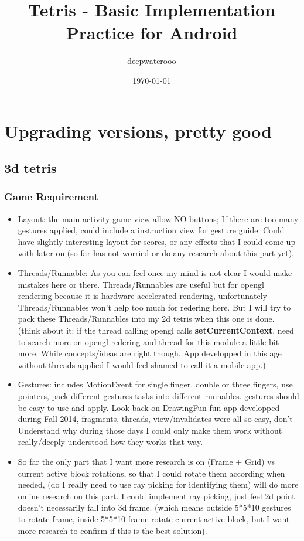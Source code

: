 \documentclass[9pt,b5paper]{article}
\author{deepwaterooo}
\date{\today}
\title{Tetris - Basic Implementation Practice for Android}
\begin{document}
\maketitle
\tableofcontents


\section{Upgrading versions, pretty good}
\label{sec-1}
\subsection{3d tetris}
\label{sec-1-1}
\subsubsection{Game Requirement}
\label{sec-1-1-1}
\begin{itemize}
\item Layout: the main activity game view allow NO buttons; If there are too many gestures applied, could include a instruction view for gesture guide. Could have slightly interesting layout for scores, or any effects that I could come up with later on (so far has not worried or do any research about this part yet).
\item Threads/Runnable: As you can feel once my mind is not clear I would make mistakes here or there. Threads/Runnables are useful but for opengl rendering because it is hardware accelerated rendering, unfortunately Threads/Runnables won't help too much for redering here. But I will try to pack these Threads/Runnables into my 2d tetris when this one is done. (think about it: if the thread calling opengl calls \textbf{setCurrentContext}. need to search more on opengl redering and thread for this module a little bit more. While concepts/ideas are right though. App developped in this age without threads applied I would feel shamed to call it a mobile app.)
\item Gestures: includes MotionEvent for single finger, double or three fingers, use pointers, pack different gestures tasks into different runnables. gestures should be easy to use and apply. Look back on DrawingFun fun app developped during Fall 2014, fragments, threads, view/invalidates were all so easy, don't Understand why during those days I could only make them work without really/deeply understood how they works that way.
\item So far the only part that I want more research is on (Frame + Grid) vs current active block rotations, so that I could rotate them according when needed, (do I really need to use ray picking for identifying them) will do more online research on this part. I could implement ray picking, just feel 2d point doesn't necessarily fall into 3d frame. (which means outside 5*5*10 gestures to rotate frame, inside 5*5*10 frame rotate current active block, but I want more research to confirm if this is the best solution).

\end{itemize}
\end{document}
